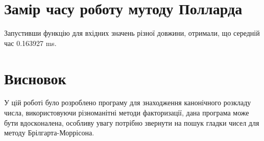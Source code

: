 \documentclass{article}
\begin{document}
\section{Замір часу роботу мутоду Полларда}
\quad Запустивши функцію для вхідних значень різної довжини, отримали, що середній час 0.163927 ms.

\section{Висновок}
\quad
У цій роботі було розроблено програму для знаходження канонічного розкладу числа, використовуючи різноманітні методи факторизації, дана програма може бути вдосконалена, особливу увагу потрібно звернути на пошук гладки чисел для методу Брілгарта-Моррісона.
\end{document}
